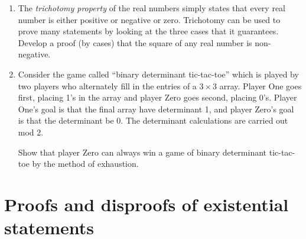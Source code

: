 \documentclass[10pt,]{book}
\theoremstyle{plain}
\theoremstyle{definition}
\theoremstyle{definition}
\numberwithin{equation}{section}
\newcommand{\hint}[1]{ }
\begin{document}
\begin{enumerate}[label=(\alph*)]
          \hint{The following Sage code generates all the numbers up to \(100\) that \emph{can} be written
          as the sum of at most \(3\) squares.

          \lstinline?var('x y z') 
          a=[s?
          }
\item\hypertarget{li-284}{}
          The \emph{trichotomy property} of the real 
          numbers simply states that every real number is either positive or negative 
          or zero.  Trichotomy can be used to prove many statements by looking at the
          three cases that it guarantees.  Develop a proof (by cases) that the square of
          any real number is non-negative.

          \hint{By trichotomy, x is either zero, negative, or positive. If x is zero, its square is zero. If x is negative, its square is positive. If x is positive, its square is also positive.}
\item\hypertarget{li-285}{}
          Consider the game called ``binary determinant tic-tac-toe''  
          which is played by two players who alternately fill in the entries of a 
          \(3 \times 3\) array.  Player One goes first, placing 1's in the array and 
          player Zero goes second, placing 0's.  Player One's goal is that the 
          final array have determinant 1, and player Zero's goal is that the 
          determinant be 0.  The determinant calculations are carried out mod 2.

          Show that player Zero can always win a game of binary determinant tic-tac-toe
          by the method of exhaustion.

          \hint{If you know something about determinants it would help here.  The determinant will be
          0 if there are two identical rows (or columns) in the finished array.  Also, if there is a row or column
          that is all zeros, player Zero wins too.  Also, cyclically permuting either rows or columns has no effect
          on the determinant of a binary array.  This means we lose no generality in assuming player One's
          first move goes (say) in the upper-left corner.}
\end{enumerate}
\typeout{************************************************}
\typeout{************************************************}
\section[{Proofs and disproofs of existential statements}]{Proofs and disproofs of existential statements}\label{sec_exist}
\end{document}
